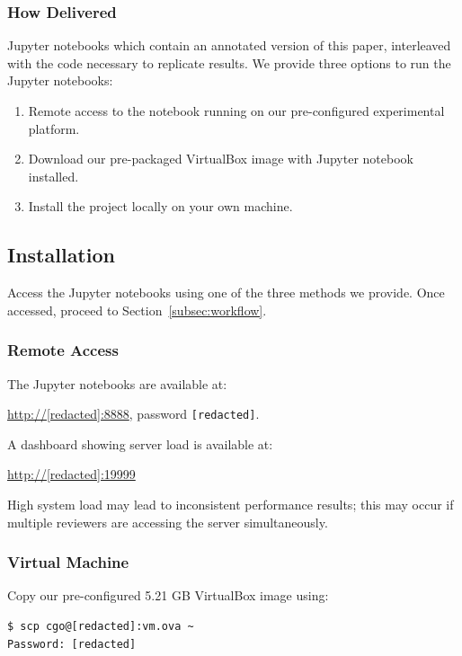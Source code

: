 \subsubsection{How Delivered}

Jupyter notebooks which contain an annotated version of this paper, interleaved with the code necessary to replicate results. We provide three options to run the Jupyter notebooks:
\begin{enumerate}
  \item Remote access to the notebook running on our pre-configured experimental platform.
  \item Download our pre-packaged VirtualBox image with Jupyter notebook installed.
  \item Install the project locally on your own machine.
\end{enumerate}

\subsection{Installation}\label{subsec:installation}

Access the Jupyter notebooks using one of the three methods we provide. Once accessed, proceed to Section~\ref{subsec:workflow}.

\subsubsection{Remote Access}

The Jupyter notebooks are available at:

\url{http://[redacted]:8888}, password \texttt{[redacted]}.

\noindent
A dashboard showing server load is available at:

\url{http://[redacted]:19999}

\noindent
High system load may lead to inconsistent performance results; this may occur if multiple reviewers are accessing the server simultaneously.

\newpage
\subsubsection{Virtual Machine}

Copy our pre-configured 5.21 GB VirtualBox image using:
\begin{verbatim}
$ scp cgo@[redacted]:vm.ova ~
Password: [redacted]
\end{verbatim}


